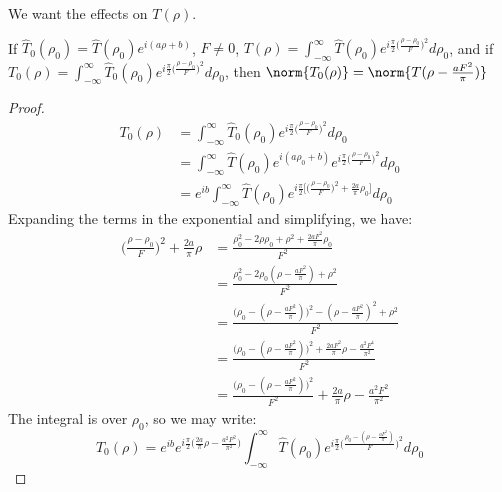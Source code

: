             We want the effects on $T(\rho)$.
            \begin{theorem}
            If $\hat{T}_0(\rho_0) = \hat{T}(\rho_0)e^{i(a\rho+b)}$, $F\ne 0$, $T(\rho) = \int_{-\infty}^{\infty}\hat{T}(\rho_0)e^{i\frac{\pi}{2}\big(\frac{\rho-\rho_0}{F}\big)^2} d\rho_0$, and if $T_{0}(\rho) = \int_{-\infty}^{\infty}\hat{T}_{0}(\rho_0)e^{i\frac{\pi}{2}\big(\frac{\rho-\rho_0}{F}\big)^2} d\rho_0$, then $\norm{T_{0}(\rho)} = \norm{T(\rho - \frac{aF^2}{\pi})}$
            \end{theorem}
            \begin{proof}
            \begin{align*}
            T_0(\rho) &= \int_{-\infty}^{\infty} \hat{T}_{0}(\rho_0)e^{i\frac{\pi}{2}\big(\frac{\rho-\rho_0}{F}\big)^2}d\rho_0\\
            &=\int_{-\infty}^{\infty} \hat{T}(\rho_0)e^{i(a\rho_0+b)}e^{i\frac{\pi}{2}\big(\frac{\rho - \rho_0}{F}\big)^2}d\rho_0 \\
            	&= e^{ib}\int_{-\infty}^{\infty}\hat{T}(\rho_0)e^{i\frac{\pi}{2}\bigg[\big(\frac{\rho-\rho_0}{F}\big)^2 + \frac{2a}{\pi}\rho_0\bigg]}d\rho_0
            \end{align*}
            Expanding the terms in the exponential and simplifying, we have:
            \begin{align*}
                \big(\frac{\rho-\rho_0}{F}\big)^2 + \frac{2a}{\pi}\rho &= \frac{\rho_0^2 - 2\rho\rho_0 + \rho^2 + \frac{2aF^2}{\pi}\rho_0}{F^2}\\
                &= \frac{\rho_0^2 - 2\rho_0(\rho - \frac{aF^2}{\pi}) + \rho^2}{F^2}\\
                &= \frac{\big(\rho_0 - (\rho - \frac{aF^2}{\pi})\big)^2 - (\rho - \frac{aF^2}{\pi})^2 + \rho^2}{F^2}\\
                &= \frac{\big(\rho_0 - (\rho-\frac{aF^2}{\pi})\big)^2 +\frac{2aF^2}{\pi}\rho - \frac{a^2F^4}{\pi^2}}{F^2}\\
                &= \frac{\big(\rho_0 - (\rho-\frac{aF^2}{\pi})\big)^2}{F^2} + \frac{2a}{\pi}\rho - \frac{a^2F^2}{\pi^2}
            \end{align*}
            The integral is over $\rho_0$, so we may write:
            \begin{equation*}
            T_0(\rho) = e^{ib}e^{i\frac{\pi}{2}\big(\frac{2a}{\pi}\rho - \frac{a^2F^2}{\pi^2}\big)}\int_{-\infty}^{\infty} \hat{T}(\rho_0)e^{i\frac{\pi}{2}\big(\frac{\rho_0 - (\rho - \frac{aF^2}{\pi})}{F}\big)^2}d\rho_0
            \end{equation*}

\end{proof}
